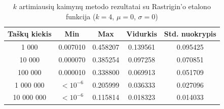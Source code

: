 \begin{table}[H]
    \centering
    \begin{tabular}{|c|c|c|c|c|}
        \hline
        \textbf{Taškų kiekis} & \textbf{Min} & \textbf{Max} & \textbf{Vidurkis} & \textbf{Std. nuokrypis} \\ \hline
        1 000        & 0.007010 & 0.458207 & 0.139561 & 0.095425 \\ \hline
        10 000       & 0.000070 & 0.385254 & 0.097258 & 0.070851 \\ \hline
        100 000      & 0.000010 & 0.338800 & 0.069913 & 0.051709 \\ \hline
        1 000 000    & $<10^{-6}$ & 0.205999 & 0.036333 & 0.027096 \\ \hline
        10 000 000   & $<10^{-6}$ & 0.115814 & 0.018323 & 0.014033 \\ \hline
    \end{tabular}
    \caption{$k$ artimiausių kaimynų metodo rezultatai su Rastrigin'o etalono funkcija ($k = 4$, $\mu = 0$, $\sigma = 0$)}
\end{table}